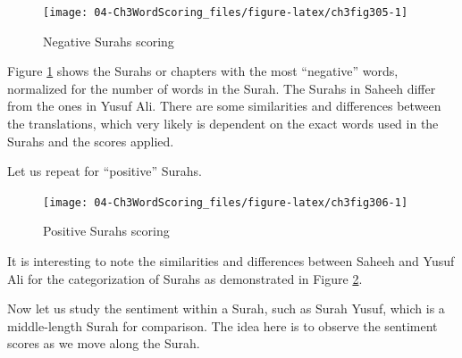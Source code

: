 \documentclass[
]{article}
\begin{document}
\begin{figure}

{\centering \texttt{[image: 04-Ch3WordScoring\_files/figure-latex/ch3fig305-1]} 

}

\caption{Negative Surahs scoring}\label{fig:ch3fig305}
\end{figure}

Figure \ref{fig:ch3fig305} shows the Surahs or chapters with the most ``negative'' words, normalized for the number of words in the Surah. The Surahs in Saheeh differ from the ones in Yusuf Ali. There are some similarities and differences between the translations, which very likely is dependent on the exact words used in the Surahs and the scores applied.

Let us repeat for ``positive'' Surahs.

\begin{figure}

{\centering \texttt{[image: 04-Ch3WordScoring\_files/figure-latex/ch3fig306-1]} 

}

\caption{Positive Surahs scoring}\label{fig:ch3fig306}
\end{figure}

It is interesting to note the similarities and differences between Saheeh and Yusuf Ali for the categorization of Surahs as demonstrated in Figure \ref{fig:ch3fig306}.

Now let us study the sentiment within a Surah, such as Surah Yusuf, which is a middle-length Surah for comparison. The idea here is to observe the sentiment scores as we move along the Surah.
\end{document}

